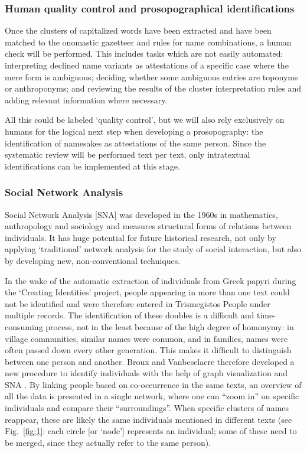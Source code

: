 \documentclass[amsthm,ebook]{saparticle}
\begin{document}
\subsubsection{Human quality control and prosopographical identifications}


\noindent Once the clusters of capitalized words have been extracted and have been matched to the onomastic gazetteer and rules
for name combinations, a human check will be performed. This includes tasks which are not easily automated:
interpreting declined name variants as attestations of a specific case where the mere form is ambiguous; deciding
whether some ambiguous entries are toponyms or anthroponyms; and reviewing the results of the cluster interpretation
rules and adding relevant information where necessary. 

All this could be labeled `quality control', but we will also rely exclusively on humans for the logical next step when
developing a prosopography: the identification of namesakes as attestations of the same person. Since the systematic
review will be performed text per text, only intratextual identifications can be implemented at this stage.




\subsubsection{Social Network Analysis}


\noindent Social Network Analysis [SNA] was developed in the 1960s in mathematics, anthropology and sociology and measures
structural forms of relations between individuals. It has huge potential for future historical research, not only by
applying `traditional' network analysis for the study of social interaction, but also by developing new,
non-conventional techniques.

In the wake of the automatic extraction of individuals from Greek papyri during the `Creating Identities' project,
people appearing in more than one text could not be identified and were therefore entered in Trismegistos People under
multiple records. The identification of these doubles is a difficult and time-consuming process, not in the least
because of the high degree of homonymy: in village communities, similar names were common, and in families, names were
often passed down every other generation. This makes it difficult to distinguish between one person and another. Broux
and Vanbeselaere therefore developed a new procedure to identify individuals with the help of graph visualization and
SNA \citep{BrouxVanbeselaere}. By linking people based on co-occurrence in the same texts, an overview of
all the data is presented in a single network, where one can ``zoom in'' on specific individuals and compare their
``surroundings''. When specific clusters of names reappear, these are likely the same individuals mentioned in different
texts (see Fig.~\ref{fig:1}: each circle [or `node'] represents an individual; some of these need to be merged, since they
actually refer to the same person). 
\end{document}
